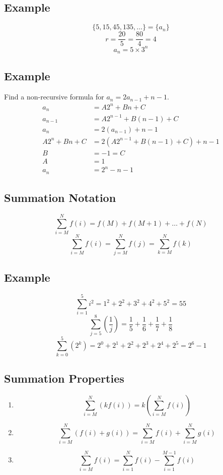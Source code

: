 \documentclass{math}
\begin{document}
\subsection*{Example}
\[ \{5,15,45,135,\dots\} = \{a_{n}\} \]
\[ r = \frac{20}{5} = \frac{80}{4} = 4 \]
\[ a_{n} = 5\times 3^{n} \]

\subsection*{Example}
Find a non-recursive formula for \( a_{n} = 2a_{n-1}+n-1 \).
\begin{align*}
  a_{n} &= A2^{n}+Bn+C \\
  a_{n-1} &= A2^{n-1}+B(n-1)+C \\
  a_{n} &= 2(a_{n-1})+n-1 \\
  A2^{n}+Bn+C &= 2(A2^{n-1}+B(n-1)+C)+n-1 \\
  B &= -1 = C \\
  A &= 1 \\
  a_{n} &= 2^{n}-n-1
\end{align*}

\subsection*{Summation Notation}
\[ \sum_{i=M}^{N}f(i) = f(M)+f(M+1)+\dots+f(N) \]
\[ \sum_{i=M}^{N}f(i) = \sum_{j=M}^{N}f(j) = \sum_{k=M}^{N}f(k) \]

\subsection*{Example}
\[ \sum_{i=1}^{5}i^{2} = 1^{2}+2^{2}+3^{2}+4^{2}+5^{2} = 55 \]
\[ \sum_{j=5}^{8}(\frac{1}{j}) = \frac{1}{5}+\frac{1}{6}+\frac{1}{7}+
   \frac{1}{8} \]
\[ \sum_{k=0}^{5}(2^{k}) = 2^{0}+2^{1}+2^{2}+2^{3}+2^{4}+2^{5} = 2^{6}-1 \]

\subsection*{Summation Properties}
\begin{enumerate}
  \item
    \[ \sum_{i=M}^{N}(kf(i)) = k(\sum_{i=M}^{N}f(i)) \]
  \item
    \[ \sum_{i=M}^{N}(f(i)+g(i)) = \sum_{i=M}^{N}f(i)+\sum_{i=M}^{N}g(i) \]
  \item
    \[ \sum_{i=M}^{N}f(i) = \sum_{i=1}^{N}f(i)-\sum_{i=1}^{M-1}f(i) \]
\end{enumerate}
\end{document}
